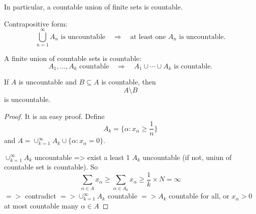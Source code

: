 In particular, a countable union of finite sets is countable.

Contrapositive form:
\[
\bigcup_{n=1}^{\infty} A_n\text{ is uncountable}
\quad\Longrightarrow\quad
\text{at least one }A_n\text{ is uncountable}.
\]

A finite union of countable sets is countable:
\[
A_1,\ldots,A_k\text{ countable}
\quad\Longrightarrow\quad
A_1\cup\cdots\cup A_k
\text{ is countable}.
\]

If \(A\) is uncountable and \(B\subseteq A\) is countable, then
\[
A\setminus B
\]
is uncountable.

\begin{proof}
It is an easy proof.
Define \[A_k = \{\alpha: x_\alpha \geq \frac{1}{n}\}\]
and \(A = \cup_{k=1}^{\infty}A_k \cup \{\alpha: x_\alpha = 0\}\).

\(\cup_{k=1}^{\infty}A_k\) uncountable => exist a least 1 \(A_k\) uncountable (if not, uniun of countable set is countable). So 
\[
   \sum_{\alpha \in A}x_\alpha \geq \sum_{\alpha \in A_k}x_\alpha \geq \frac{1}{k} \times N = \infty
\]
\(=>\) contradict \(=> \cup_{k=1}^{\infty}A_k\) countable \(=> A_k\) countable for all, or \(x_\alpha > 0\) at most countable many \(\alpha \in A\)

\end{proof}